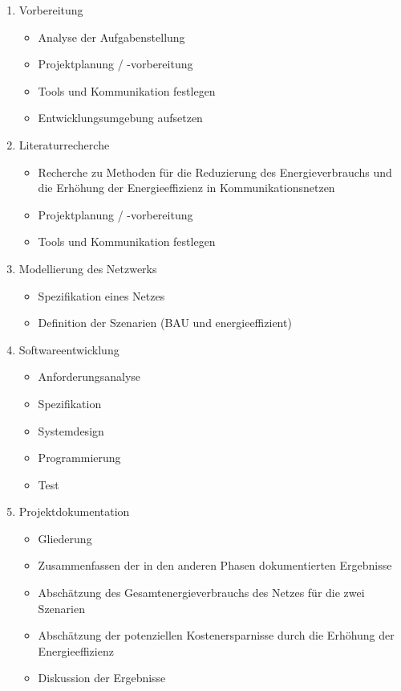 \documentclass[12pt,titlepage]{article}
\begin{document}
\begin{enumerate}
\item Vorbereitung
\begin{itemize}
\item Analyse der Aufgabenstellung
\item Projektplanung / -vorbereitung
\item Tools und Kommunikation festlegen
\item Entwicklungsumgebung aufsetzen
\end{itemize}

\item Literaturrecherche
\begin{itemize}
\item Recherche zu Methoden für die Reduzierung des Energieverbrauchs und die Erhöhung der Energieeffizienz in Kommunikationsnetzen
\item Projektplanung / -vorbereitung
\item Tools und Kommunikation festlegen
\end{itemize}

\item Modellierung des Netzwerks
\begin{itemize}
\item Spezifikation eines Netzes
\item Definition der Szenarien (BAU und energieeffizient)
\end{itemize}

\item Softwareentwicklung
\begin{itemize}
\item Anforderungsanalyse
\item Spezifikation
\item Systemdesign
\item Programmierung
\item Test
\end{itemize}

\item Projektdokumentation
\begin{itemize}
\item Gliederung
\item Zusammenfassen der in den anderen Phasen dokumentierten Ergebnisse
\item Abschätzung des Gesamtenergieverbrauchs des Netzes für die zwei Szenarien
\item Abschätzung der potenziellen Kostenersparnisse durch die Erhöhung der Energieeffizienz
\item Diskussion der Ergebnisse
\end{itemize}


\end{enumerate}
\end{document}
